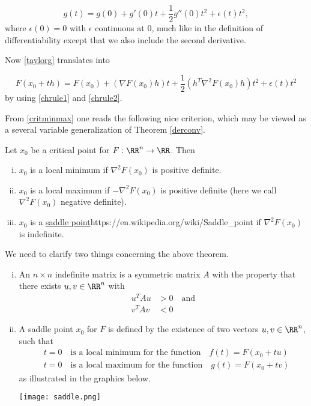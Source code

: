 \documentclass{article}
\begin{document}
\begin{equation}\label{taylorg}
g(t) = g(0) + g'(0) t + \frac{1}{2} g''(0) t^2 + \epsilon(t)t^2,
\end{equation}
where $\epsilon(0) = 0$ with $\epsilon$ continuous at $0$, much like
in the definition of differentiability except that we also include
the second derivative.

Now \eqref{taylorg} translates into

\begin{equation}\label{critminmax}
  F(x_0 + t h) = F(x_0) + \left(\nabla F(x_0) h \right) t + \frac{1}{2} \left( h^T \nabla^2 F(x_0) h \right) t^2 + \epsilon(t) t^2 
\end{equation}
by using \eqref{chrule1} and \eqref{chrule2}.

From \eqref{critminmax} one reads the following nice criterion, which may be viewed as a several variable generalization of Theorem \ref{derconv}.

\begin{theorem}[emph]\label{thmcritminmax}
  Let $x_0$ be a critical point for $F:\RR^n\rightarrow \RR$. Then
  \begin{enumerate}[(i)]
  \item
    $x_0$ is a local minimum if $\nabla^2 F(x_0)$ is positive definite.
  \item
    $x_0$ is a local maximum if $-\nabla^2 F(x_0)$ is positive definite (here we call
    $\nabla^2 F(x_0)$ negative definite).
  \item\label{thmcritminsaddle}
    $x_0$ is a \url{saddle point}{https://en.wikipedia.org/wiki/Saddle_point} if $\nabla^2 F(x_0)$ is indefinite.
  \end{enumerate}
\end{theorem}

\begin{remark}
  We need to clarify two things concerning the above theorem. 

  \begin{enumerate}[(i)]
  \item
    An $n\times n$ indefinite matrix is a symmetric matrix $A$ with the property that there exists
    $u, v\in \RR^n$ with
    \begin{align*}
      u^T A u &>0\quad\text{and}\\
      v^T A v &<0
    \end{align*}
  \item
    A saddle point $x_0$ for $F$ is defined by the existence of two vectors $u, v\in \RR^n$, such that
    \begin{align*}
      &t=0\quad \text{is a local minimum for the function}\quad f(t) = F(x_0 + t u)\\
      &t=0\quad \text{is a local maximum for the function}\quad  g(t) = F(x_0 + t v)
    \end{align*}
    as illustrated in the graphics below.

    \texttt{[image: saddle.png]}
    \end{enumerate}
\end{remark}
\end{document}
